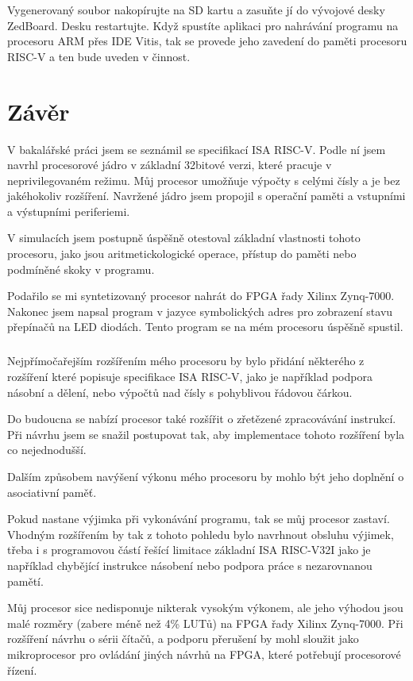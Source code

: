 \documentclass[FM,BP]{tulthesis}
\begin{document}
Vygenerovaný soubor nakopírujte na SD kartu a zasuňte jí do vývojové desky ZedBoard. Desku restartujte. Když spustíte aplikaci pro nahrávání programu na procesoru ARM přes IDE Vitis, tak se provede jeho zavedení do paměti procesoru RISC-V a ten bude uveden v činnost. 

\chapter{Závěr}

V bakalářské práci jsem se seznámil se specifikací ISA RISC-V. Podle ní jsem navrhl procesorové jádro v základní 32bitové verzi, které pracuje v neprivilegovaném režimu. Můj procesor umožňuje výpočty s celými čísly a je bez jakéhokoliv rozšíření. Navržené jádro jsem propojil s operační paměti a vstupními a výstupními periferiemi. 

V simulacích jsem postupně úspěšně otestoval základní vlastnosti tohoto procesoru, jako jsou aritmetickologické operace, přístup do paměti nebo podmíněné skoky v programu. 

Podařilo se mi syntetizovaný procesor nahrát do FPGA řady Xilinx Zynq-7000. Nakonec jsem napsal program v jazyce symbolických adres pro zobrazení stavu přepínačů na LED diodách. Tento program se na mém procesoru úspěšně spustil.

\paragraph{}
Nejpřímočařejším rozšířením mého procesoru by bylo přidání některého z rozšíření které popisuje specifikace ISA RISC-V, jako je například podpora násobní a dělení, nebo výpočtů nad čísly s pohyblivou řádovou čárkou. 

Do budoucna se nabízí procesor také rozšířit o zřetězené zpracovávání instrukcí. Při návrhu jsem se snažil postupovat tak, aby implementace tohoto rozšíření byla co nejednodušší. 

Dalším způsobem navýšení výkonu mého procesoru by mohlo být jeho doplnění o asociativní paměť.

Pokud nastane výjimka při vykonávání programu, tak se můj procesor zastaví. Vhodným rozšířením by tak z tohoto pohledu bylo navrhnout obsluhu výjimek, třeba i s programovou částí řešící limitace základní ISA RISC-V32I jako je například chybějící instrukce násobení nebo podpora práce s nezarovnanou pamětí.

Můj procesor sice nedisponuje nikterak vysokým výkonem, ale jeho výhodou jsou malé rozměry (zabere méně než 4\% LUTů) na FPGA řady Xilinx Zynq-7000. Při rozšíření návrhu o sérii čítačů, a podporu přerušení by mohl sloužit jako mikroprocesor pro ovládání jiných návrhů na FPGA, které potřebují procesorové řízení. 
\end{document}
